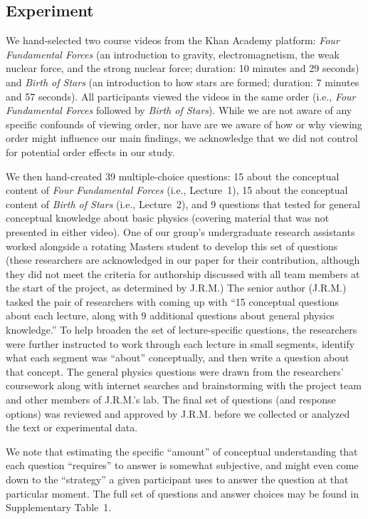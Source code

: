 \documentclass[10pt]{article}
\newcommand{\questions}{1}
\begin{document}
\subsection*{Experiment}\label{subsec:experiment}

We hand-selected two course videos from the Khan Academy platform: \textit{Four
Fundamental Forces} (an introduction to gravity, electromagnetism, the weak
nuclear force, and the strong nuclear force; duration: 10 minutes and 29
seconds) and \textit{Birth of Stars} (an introduction to how stars are formed;
duration: 7 minutes and 57 seconds). All participants viewed the videos in the
same order (i.e., \textit{Four Fundamental Forces} followed by \textit{Birth of
Stars}). While we are not aware of any specific confounds of viewing order, nor
have are we aware of how or why viewing order might influence our main
findings, we acknowledge that we did not control for potential order effects in
our study.

We then hand-created 39 multiple-choice questions: 15 about the conceptual
content of \textit{Four Fundamental Forces} (i.e., Lecture~1), 15 about the
conceptual content of \textit{Birth of Stars} (i.e., Lecture~2), and 9
questions that tested for general conceptual knowledge about basic physics
(covering material that was not presented in either video). One of our group's
undergraduate research assistants worked alongside a rotating Masters student
to develop this set of questions (these researchers are acknowledged in our
paper for their contribution, although they did not meet the criteria for
authorship discussed with all team members at the start of the project, as
determined by J.R.M.) The senior author (J.R.M.) tasked the pair of researchers
with coming up with ``15 conceptual questions about each lecture, along with 9
additional questions about general physics knowledge.'' To help broaden the set
of lecture-specific questions, the researchers were further instructed to work
through each lecture in small segments, identify what each segment was
``about'' conceptually, and then write a question about that concept. The
general physics questions were drawn from the researchers' coursework along
with internet searches and brainstorming with the project team and other
members of J.R.M.'s lab. The final set of questions (and response options) was
reviewed and approved by J.R.M. before we collected or analyzed the text or
experimental data.

We note that estimating the specific ``amount'' of conceptual understanding
that each question ``requires'' to answer is somewhat subjective, and might
even come down to the ``strategy'' a given participant uses to answer the
question at that particular moment. The full set of questions and answer
choices may be found in Supplementary Table~\questions.
\end{document}
